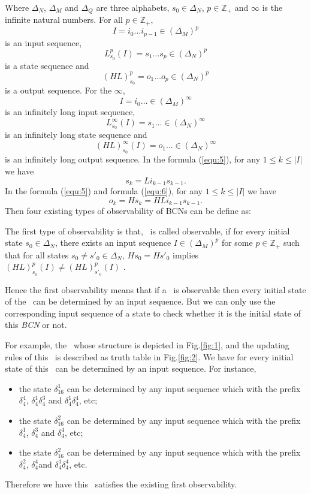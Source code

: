Where $\Delta_N$, $\Delta_M$ and $\Delta_Q$ are three alphabets, $s_0\in \Delta_N$, $p\in \mathbb{Z}_+$ and $\infty$ is the infinite natural numbers. For all  $p\in \mathbb{Z}_+$, \[I=i_0 \ldots i_{p-1} \in(\Delta_M)^p\] is an input sequence, \[L^p_{s_0}(I)=s_1 \ldots s_{p} \in(\Delta_N)^p\] is a state sequence and \[(HL)^p_{s_0}=o_1 \ldots o_{p} \in(\Delta_N)^p\] is a output sequence. For the $\infty$, \[I=i_0 \ldots  \in(\Delta_M)^{\infty}\] is an infinitely long input sequence, \[L^{\infty}_{s_0}(I)=s_1 \ldots  \in(\Delta_N)^{\infty}\] is an infinitely long state sequence and \[(HL)^{\infty}_{s_0}(I)=o_1 \ldots \in(\Delta_N)^{\infty}\] is an infinitely long output sequence. In the formula (\ref{equ:5}), for any $1\le k \le |I|$ we have \[s_k=Li_{k-1}s_{k-1}.\] In the formula (\ref{equ:5}) and formula (\ref{equ:6}), for any $1\le k \le |I|$ we have  \[o_k=Hs_k=HLi_{k-1}s_{k-1}.\] Then four existing types of observability of BCNs can be define as: 
\begin{definition}
The first type of observability is that, \BCN\ is called observable, if for every initial state $s_0 \in \Delta_N$, there exists an input sequence $I\in(\Delta_M)^p$ for some $p\in \mathbb{Z}_+$ such that for all states $s_0\neq {s'}_0\in \Delta_N$, $Hs_0=H{s'}_0$ implies $(HL)^p_{s_0}(I)\neq (HL)^p_{{s'}_0}(I)$ \cite{cheng2009controllability}.
\end{definition}

Hence the first observability means that if a \BCN\ is observable then every initial state of the \BCN\ can be determined by an input sequence. But we can only use the corresponding input sequence of a state to check whether it is the initial state of this {\em BCN} or not.
\begin{example}
For example, the \BCN\ whose structure is depicted in Fig.\ref{fig:1}, and the updating rules of this \BCN\ is described as truth table in Fig.\ref{fig:2}.  We have for every initial state of this \BCN\ can be determined by an input sequence.  For instance,
\begin{itemize}
  \item the state $\delta_{16}^1$ can be determined by any input sequence which with the prefix $\delta_{4}^4$, $\delta_{4}^1 \delta_{4}^3$ and $\delta_{4}^1 \delta_{4}^4$, etc;
  \item the state $\delta_{16}^2$ can be determined by any input sequence which with the prefix $\delta_{4}^1$, $\delta_{4}^3$ and $\delta_{4}^4$, etc;
  \item the state $\delta_{16}^2$ can be determined by any input sequence which with the prefix $\delta_{4}^2$, $\delta_{4}^4$and $\delta_{4}^1 \delta_{4}^4$, etc.
\end{itemize} 
Therefore we have this \BCN\ satisfies the existing first observability.
\end{example}   

